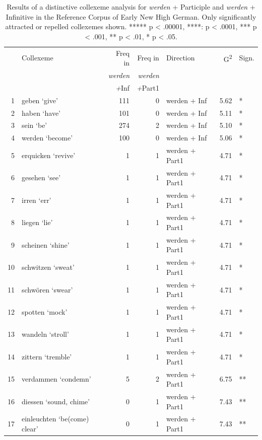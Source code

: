 \documentclass[output=paper,colorlinks,citecolor=brown]{langscibook}
\begin{document}
\begin{table}[ht]
\caption{Results of a distinctive collexeme analysis for \textit{werden} + Participle and \textit{werden} + Infinitive in the Reference Corpus of Early New High German. Only significantly attracted or repelled collexemes shown. ***** p < .00001, ****: p < .0001, *** p < .001, ** p < .01, * p < .05.}
\label{tab:hs:dist_collex_ref}
\centering
\footnotesize
\begin{tabular}{rlrrlrl}
\lsptoprule
 & Collexeme & Freq in  & Freq in  & Direction & G\textsuperscript{2} & Sign. \\ 
 &  & \textit{werden} &  \textit{werden} &  &  &  \\ 
 &  & \textit+Inf &  \textit+Part1 &  &  &  \\ 
  \midrule
1 & geben `give'& 111 &   0 & werden + Inf & 5.62 & * \\ 
  2 & haben `have'& 101 &   0 & werden + Inf & 5.11 & * \\ 
  3 & sein `be'& 274 &   2 & werden + Inf & 5.10 & * \\ 
  4 & werden `become'& 100 &   0 & werden + Inf & 5.06 & * \\ 
  5 & erquicken `revive'&   1 &   1 & werden + Part1 & 4.71 & * \\ 
  6 & gesehen `see'&   1 &   1 & werden + Part1 & 4.71 & * \\ 
  7 & irren `err'&   1 &   1 & werden + Part1 & 4.71 & * \\ 
  8 & liegen `lie'&   1 &   1 & werden + Part1 & 4.71 & * \\ 
  9 & scheinen `shine'&   1 &   1 & werden + Part1 & 4.71 & * \\ 
  10 & schwitzen `sweat'&   1 &   1 & werden + Part1 & 4.71 & * \\ 
  11 & schwören `swear'&   1 &   1 & werden + Part1 & 4.71 & * \\ 
  12 & spotten `mock'&   1 &   1 & werden + Part1 & 4.71 & * \\ 
  13 & wandeln `stroll'&   1 &   1 & werden + Part1 & 4.71 & * \\ 
  14 & zittern `tremble'&   1 &   1 & werden + Part1 & 4.71 & * \\ 
  15 & verdammen `condemn'&   5 &   2 & werden + Part1 & 6.75 & ** \\ 
  16 & diessen `sound, chime' &   0 &   1 & werden + Part1 & 7.43 & ** \\ 
  17 & einleuchten `be(come) clear' &   0 &   1 & werden + Part1 & 7.43 & ** \\ 

\end{tabular}
\end{table}
\end{document}
